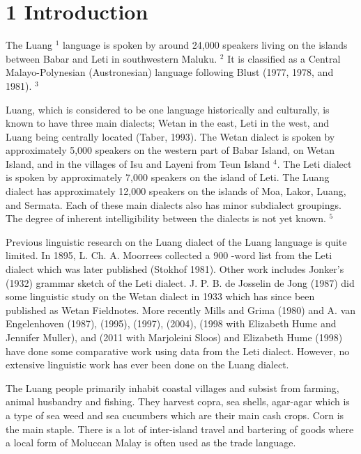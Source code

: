 \documentclass[10pt]{article}
\begin{document}
\section*{1 Introduction}
The Luang \({ }^{1}\) language is spoken by around 24,000 speakers living on the islands between Babar and Leti in southwestern Maluku. \({ }^{2}\) It is classified as a Central Malayo-Polynesian (Austronesian) language following Blust (1977, 1978, and 1981). \({ }^{3}\)

Luang, which is considered to be one language historically and culturally, is known to have three main dialects; Wetan in the east, Leti in the west, and Luang being centrally located (Taber, 1993). The Wetan dialect is spoken by approximately 5,000 speakers on the western part of Babar Island, on Wetan Island, and in the villages of Isu and Layeni from Teun Island \({ }^{4}\). The Leti dialect is spoken by approximately 7,000 speakers on the island of Leti. The Luang dialect has approximately 12,000 speakers on the islands of Moa, Lakor, Luang, and Sermata. Each of these main dialects also has minor subdialect groupings. The degree of inherent intelligibility between the dialects is not yet known. \({ }^{5}\)

Previous linguistic research on the Luang dialect of the Luang language is quite limited. In 1895, L. Ch. A. Moorrees collected a 900 -word list from the Leti dialect which was later published (Stokhof 1981). Other work includes Jonker's (1932) grammar sketch of the Leti dialect. J. P. B. de Josselin de Jong (1987) did some linguistic study on the Wetan dialect in 1933 which has since been published as Wetan Fieldnotes. More recently Mills and Grima (1980) and A. van Engelenhoven (1987), (1995), (1997), (2004), (1998 with Elizabeth Hume and Jennifer Muller), and (2011 with Marjoleini Sloos) and Elizabeth Hume (1998) have done some comparative work using data from the Leti dialect. However, no extensive linguistic work has ever been done on the Luang dialect.

The Luang people primarily inhabit coastal villages and subsist from farming, animal husbandry and fishing. They harvest copra, sea shells, agar-agar which is a type of sea weed and sea cucumbers which are their main cash crops. Corn is the main staple. There is a lot of inter-island travel and bartering of goods where a local form of Moluccan Malay is often used as the trade language.
\end{document}
